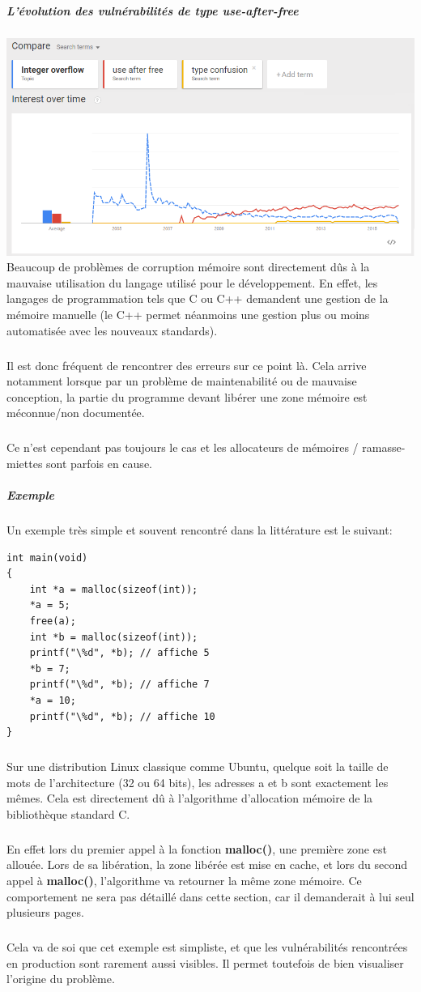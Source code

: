 \subparagraph{L'évolution des vulnérabilités de type use-after-free}
\includegraphics[scale=0.5]{histogramme-uaf.png}\newline
Beaucoup de problèmes de corruption mémoire sont directement dûs à la mauvaise utilisation
du langage utilisé pour le développement. En effet, les langages de programmation tels que C
ou C++ demandent une gestion de la mémoire manuelle (le C++ permet néanmoins une gestion plus ou moins automatisée
avec les nouveaux standards).
\subparagraph{}
Il est donc fréquent de rencontrer des erreurs sur ce point là. Cela arrive
notamment lorsque par un problème de maintenabilité ou de mauvaise conception, la partie du programme devant
libérer une zone mémoire est méconnue/non documentée.\subparagraph{}
Ce n'est cependant pas toujours le cas et les allocateurs de mémoires / ramasse-miettes sont parfois en cause.

\subparagraph{Exemple}
Un exemple très simple et souvent rencontré dans la littérature est le suivant:
\begin {lstlisting}[frame=single]
int main(void)
{
    int *a = malloc(sizeof(int));
    *a = 5;
    free(a);
    int *b = malloc(sizeof(int));
    printf("\%d", *b); // affiche 5
    *b = 7;
    printf("\%d", *b); // affiche 7
    *a = 10;
    printf("\%d", *b); // affiche 10
}
\end{lstlisting}
\subparagraph{}
Sur une distribution Linux classique comme Ubuntu, quelque soit la taille de mots
de l'architecture (32 ou 64 bits), les adresses a et b sont exactement les mêmes.
Cela est directement dû à l'algorithme d'allocation mémoire de la bibliothèque standard
C.\subparagraph{}
En effet lors du premier appel à la fonction \textbf{malloc()}, une première zone est allouée.
Lors de sa libération, la zone libérée est mise en cache, et lors du second appel à \textbf{malloc()},
l'algorithme va retourner la même zone mémoire. Ce comportement ne sera pas détaillé dans cette section, car
il demanderait à lui seul plusieurs pages.\subparagraph{}
Cela va de soi que cet exemple est simpliste, et que les vulnérabilités rencontrées en production sont
rarement aussi visibles. Il permet toutefois de bien visualiser l'origine du problème.


